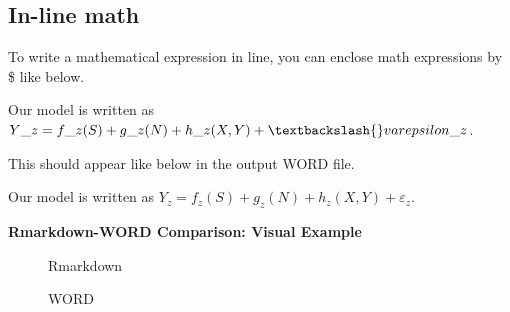 \documentclass[
  letterpaper,
  DIV=11,
  numbers=noendperiod]{scrreprt}
\newenvironment{Shaded}{\begin{snugshade}}{\end{snugshade}}
\newcommand{\NormalTok}[1]{\textcolor[rgb]{0.00,0.23,0.31}{#1}}
\begin{document}
\hypertarget{in-line-math}{%
\subsection{In-line math}\label{in-line-math}}

To write a mathematical expression in line, you can enclose math
expressions by \$ like below.

\begin{Shaded}
\begin{Highlighting}[]
\NormalTok{Our model is written as $Y\_z = f\_z(S) + g\_z(N) + h\_z(X,Y) + \textbackslash{}varepsilon\_z$.}
\end{Highlighting}
\end{Shaded}

This should appear like below in the output WORD file.

Our model is written as
\(Y_z = f_z(S) + g_z(N) + h_z(X,Y) + \varepsilon_z\).

\begin{tcolorbox}[enhanced jigsaw, colframe=quarto-callout-note-color-frame, breakable, left=2mm, toprule=.15mm, colback=white, arc=.35mm, rightrule=.15mm, bottomrule=.15mm, opacityback=0, leftrule=.75mm]

\textbf{Rmarkdown-WORD Comparison: Visual Example}\vspace{2mm}

\begin{figure}[H]

\begin{minipage}[t]{\linewidth}

{\centering 


\caption{Rmarkdown}

}

\end{minipage}%
\newline
\begin{minipage}[t]{\linewidth}

{\centering 


\caption{WORD}

}

\end{minipage}%

\end{figure}

\end{tcolorbox}
\end{document}
